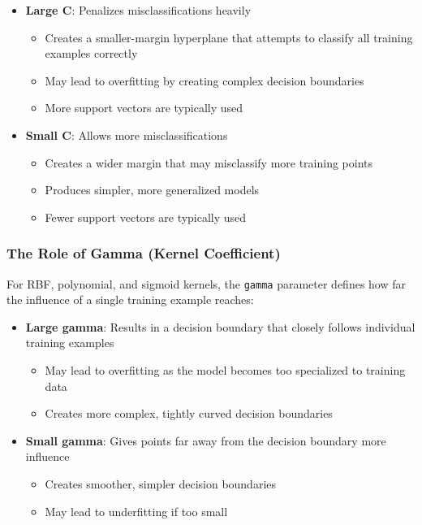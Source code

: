 \documentclass[
  letterpaper,
  DIV=11,
  numbers=noendperiod]{scrreprt}
\providecommand{\tightlist}{%
  \setlength{\itemsep}{0pt}\setlength{\parskip}{0pt}}\usepackage{longtable,booktabs,array}
\begin{document}
\begin{itemize}
\tightlist
\item
  \textbf{Large C}: Penalizes misclassifications heavily

  \begin{itemize}
  \tightlist
  \item
    Creates a smaller-margin hyperplane that attempts to classify all
    training examples correctly
  \item
    May lead to overfitting by creating complex decision boundaries
  \item
    More support vectors are typically used
  \end{itemize}
\item
  \textbf{Small C}: Allows more misclassifications

  \begin{itemize}
  \tightlist
  \item
    Creates a wider margin that may misclassify more training points
  \item
    Produces simpler, more generalized models
  \item
    Fewer support vectors are typically used
  \end{itemize}
\end{itemize}

\subsubsection{The Role of Gamma (Kernel
Coefficient)}\label{the-role-of-gamma-kernel-coefficient}

For RBF, polynomial, and sigmoid kernels, the \texttt{gamma} parameter
defines how far the influence of a single training example reaches:

\begin{itemize}
\tightlist
\item
  \textbf{Large gamma}: Results in a decision boundary that closely
  follows individual training examples

  \begin{itemize}
  \tightlist
  \item
    May lead to overfitting as the model becomes too specialized to
    training data
  \item
    Creates more complex, tightly curved decision boundaries
  \end{itemize}
\item
  \textbf{Small gamma}: Gives points far away from the decision boundary
  more influence

  \begin{itemize}
  \tightlist
  \item
    Creates smoother, simpler decision boundaries
  \item
    May lead to underfitting if too small
  \end{itemize}
\end{itemize}
\end{document}

